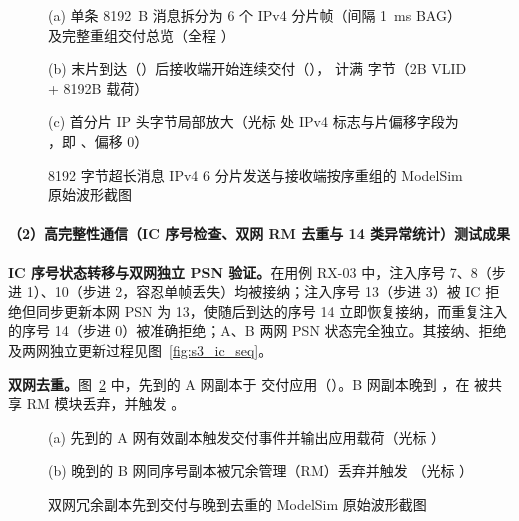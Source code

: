 \begin{figure}[H]\centering
{}\par\vspace{2pt}
{\footnotesize (a)  单条 8192~B 消息拆分为 6 个 IPv4 分片帧（间隔 1~ms BAG）及完整重组交付总览（全程 ）\par}\vspace{4pt}
\par\vspace{2pt}
{\footnotesize (b) 末片到达（）后接收端开始连续交付（）， 计满  字节（2B VLID + 8192B 载荷）\par}\vspace{4pt}
\par\vspace{2pt}
{\footnotesize (c) 首分片 IP 头字节局部放大（光标  处 IPv4 标志与片偏移字段为 ，即 、偏移 0）\par}
\caption{8192 字节超长消息 IPv4 6 分片发送与接收端按序重组的 ModelSim 原始波形截图}\label{fig:s3_cap_frag}
\end{figure}

\FloatBarrier
\paragraph{（2）高完整性通信（IC 序号检查、双网 RM 去重与 14 类异常统计）测试成果}

\textbf{IC 序号状态转移与双网独立 PSN 验证。}在用例 RX-03 中，注入序号 7、8（步进 1）、10（步进 2，容忍单帧丢失）均被接纳；注入序号 13（步进 3）被 IC 拒绝但同步更新本网 PSN 为 13，使随后到达的序号 14 立即恢复接纳，而重复注入的序号 14（步进 0）被准确拒绝；A、B 两网 PSN 状态完全独立。其接纳、拒绝及两网独立更新过程见图~\ref{fig:s3_ic_seq}。


\textbf{双网去重。}图~\ref{fig:s3_cap_rm} 中，先到的 A 网副本于  交付应用（）。B 网副本晚到 ，在  被共享 RM 模块丢弃，并触发 。

\begin{figure}[H]\centering
{}\par\vspace{2pt}
{\footnotesize (a) 先到的 A 网有效副本触发交付事件并输出应用载荷（光标 ）\par}\vspace{4pt}
\par\vspace{2pt}
{\footnotesize (b) 晚到的 B 网同序号副本被冗余管理（RM）丢弃并触发 （光标 ）\par}
\caption{双网冗余副本先到交付与晚到去重的 ModelSim 原始波形截图}\label{fig:s3_cap_rm}
\end{figure}

